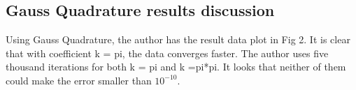 \documentclass[titlepage]{article}
\begin{document}
\subsection{Gauss Quadrature results discussion}
Using Gauss Quadrature, the author has the result data plot in Fig
2. It is clear that with coefficient k = pi, the data converges
faster. The author uses five thousand iterations for both k = pi and k
=pi*pi. It looks that neither of them could make the error smaller
than $10^{-10}$.
\end{document}
